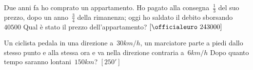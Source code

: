 \begin{multicols}{2}
\begin{esercizio}[\Ast]
\label{ese:14.63}
Due anni fa ho comprato un appartamento. Ho pagato alla consegna~\(\frac{1}{3}\) 
del suo prezzo, dopo un anno~\(\frac{3}{4}\) della rimanenza; oggi ho saldato il 
debito sborsando \officialeuro~\(40500\) Qual è stato il prezzo dell'appartamento?
 \hfill \(\left[\officialeuro~243000\right]\)
\end{esercizio}

\begin{esercizio}[\Ast]
\label{ese:14.64}
Un ciclista pedala in una direzione a~\(30\unit{km/h}\), un marciatore parte a 
piedi dallo stesso punto e alla stessa ora e va nella direzione contraria 
a~\(6\unit{km/h}\) Dopo quanto tempo saranno lontani~\(150\unit{km}\)?
 \hfill \(\left[250'\right]\)
\end{esercizio}

% 
% 
% 


\end{multicols}
